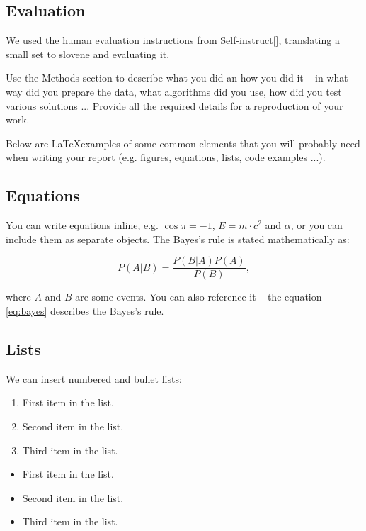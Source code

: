 \documentclass[fleqn,moreauthors,10pt]{ds_report}
\begin{document}
\subsection*{Evaluation}

We used the human evaluation instructions from Self-instruct\ref{}, translating a small set to slovene and evaluating it.

\iffalse
Use the Methods section to describe what you did an how you did it -- in what way did you prepare the data, what algorithms did you use, how did you test various solutions ... Provide all the required details for a reproduction of your work.

Below are \LaTeX examples of some common elements that you will probably need when writing your report (e.g. figures, equations, lists, code examples ...).


\subsection*{Equations}

You can write equations inline, e.g. $\cos\pi=-1$, $E = m \cdot c^2$ and $\alpha$, or you can include them as separate objects. The Bayes’s rule is stated mathematically as:

\begin{equation}
	P(A|B) = \frac{P(B|A)P(A)}{P(B)},
	\label{eq:bayes}
\end{equation}

where $A$ and $B$ are some events. You can also reference it -- the equation \ref{eq:bayes} describes the Bayes's rule.

\subsection*{Lists}

We can insert numbered and bullet lists:

\begin{enumerate}[noitemsep] 
	\item First item in the list.
	\item Second item in the list.
	\item Third item in the list.
\end{enumerate}

\begin{itemize}[noitemsep] 
	\item First item in the list.
	\item Second item in the list.
	\item Third item in the list.
\end{itemize}
\end{document}
